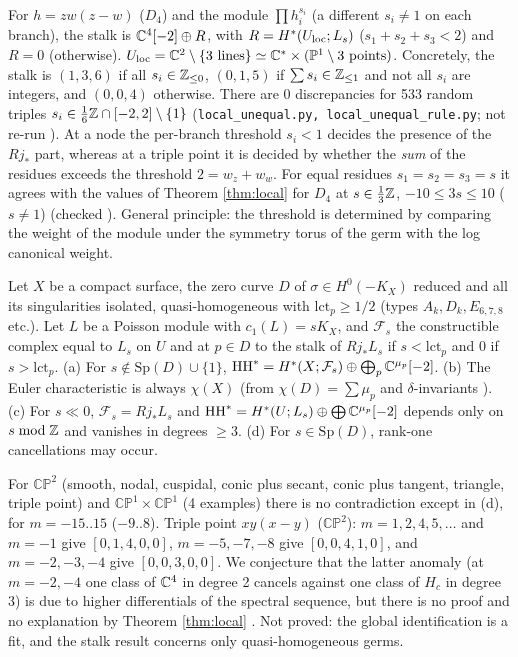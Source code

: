 \begin{obs}\label{obs:triple}
For $h=zw(z-w)$ ($D_4$) and the module $\prod h_i^{s_i}$ (a different $s_i\ne1$ on each branch), the stalk is $\mathbb C^4[-2]\oplus R$, with $R=H^*(U_{\rm loc};L_s)$ ($s_1+s_2+s_3<2$) and $R=0$ (otherwise). $U_{\rm loc}=\mathbb C^2\setminus\{3\text{ lines}\}\simeq\mathbb C^*\times(\mathbb P^1\setminus3\text{ points})$. Concretely, the stalk is $(1,3,6)$ if all $s_i\in\mathbb Z_{\le0}$, $(0,1,5)$ if $\sum s_i\in\mathbb Z_{\le1}$ and not all $s_i$ are integers, and $(0,0,4)$ otherwise. There are 0 discrepancies for 533 random triples $s_i\in\tfrac16\mathbb Z\cap[-2,2]\setminus\{1\}$ (\texttt{local\_unequal.py, local\_unequal\_rule.py}; not re-run \tQ). At a node the per-branch threshold $s_i<1$ decides the presence of the $Rj_*$ part, whereas at a triple point it is decided by whether the \emph{sum} of the residues exceeds the threshold $2=w_z+w_w$. For equal residues $s_1=s_2=s_3=s$ it agrees with the values of Theorem \ref{thm:local} for $D_4$ at $s\in\tfrac13\mathbb Z$, $-10\le3s\le10$ ($s\ne1$) (checked \tV). \tK General principle: the threshold is determined by comparing the weight of the module under the symmetry torus of the germ with the log canonical weight.
\end{obs}
\begin{conj}\tK\label{conj:refined}
Let $X$ be a compact surface, the zero curve $D$ of $\sigma\in H^0(-K_X)$ reduced and all its singularities isolated, quasi-homogeneous with $\mathrm{lct}_p\ge1/2$ (types $A_k,D_k,E_{6,7,8}$ etc.). Let $L$ be a Poisson module with $c_1(L)=sK_X$, and $\mathcal F_s$ the constructible complex equal to $L_s$ on $U$ and at $p\in D$ to the stalk of $Rj_*L_s$ if $s<\mathrm{lct}_p$ and $0$ if $s>\mathrm{lct}_p$. (a) For $s\notin\mathrm{Sp}(D)\cup\{1\}$, $\mathrm{HH}^*=H^*(X;\mathcal F_s)\oplus\bigoplus_p\mathbb C^{\mu_p}[-2]$. (b) The Euler characteristic is always $\chi(X)$ (from $\chi(D)=\sum\mu_p$ and $\delta$-invariants \tP). (c) For $s\ll0$, $\mathcal F_s=Rj_*L_s$ and $\mathrm{HH}^*=H^*(U;L_s)\oplus\bigoplus\mathbb C^{\mu_p}[-2]$ depends only on $s\bmod\mathbb Z$ and vanishes in degrees $\ge3$. (d) For $s\in\mathrm{Sp}(D)$, rank-one cancellations may occur.
\end{conj}
\tV For $\mathbb{CP}^2$ (smooth, nodal, cuspidal, conic plus secant, conic plus tangent, triangle, triple point) and $\mathbb{CP}^1\times\mathbb{CP}^1$ (4 examples) there is no contradiction except in (d), for $m=-15..15$ ($-9..8$). Triple point $xy(x-y)$ ($\mathbb{CP}^2$): $m=1,2,4,5,\dots$ and $m=-1$ give $[0,1,4,0,0]$, $m=-5,-7,-8$ give $[0,0,4,1,0]$, and $m=-2,-3,-4$ give $[0,0,3,0,0]$. We conjecture that the latter anomaly (at $m=-2,-4$ one class of $\mathbb C^4$ in degree 2 cancels against one class of $H_c$ in degree 3) is due to higher differentials of the spectral sequence, but there is no proof and no explanation by Theorem \ref{thm:local} \tK. Not proved: the global identification is a fit, and the stalk result concerns only quasi-homogeneous germs.
